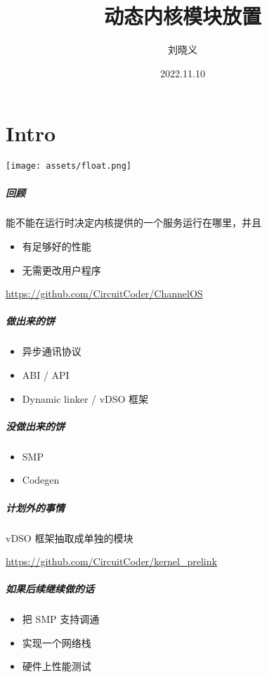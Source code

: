 \documentclass[UTF-8]{ctexbeamer}
\title{动态内核模块放置}
\author{刘晓义}
\date{2022.11.10}
\begin{document}
\part{Intro}

\begin{frame}
  \titlepage
  \begin{center}
    \texttt{[image: assets/float.png]}
  \end{center}
\end{frame}

\begin{frame}[fragile]
  \frametitle{回顾}

  能不能在运行时决定内核提供的一个服务运行在哪里，并且

  \begin{itemize}
    \item 有足够好的性能
    \item 无需更改用户程序
  \end{itemize}

  \vspace*{3em}
  \url{https://github.com/CircuitCoder/ChannelOS}
\end{frame}

\begin{frame}
  \frametitle{做出来的饼}

  \begin{itemize}
    \item 异步通讯协议
    \item ABI / API
    \item Dynamic linker / vDSO 框架
  \end{itemize}
\end{frame}

\begin{frame}
  \frametitle{没做出来的饼}

  \begin{itemize}
    \item SMP
    \item Codegen
  \end{itemize}
\end{frame}

\begin{frame}
  \frametitle{计划外的事情}

  vDSO 框架抽取成单独的模块

  \url{https://github.com/CircuitCoder/kernel_prelink}
\end{frame}

\begin{frame}
  \frametitle{如果后续继续做的话}

  \begin{itemize}
    \item 把 SMP 支持调通
    \item 实现一个网络栈
    \item 硬件上性能测试
  \end{itemize}
\end{frame}
\end{document}
